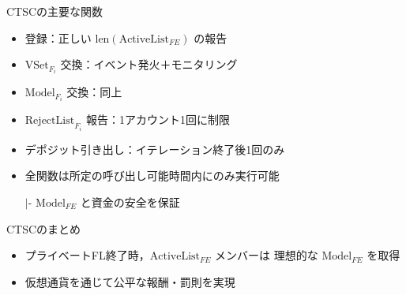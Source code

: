 \documentclass[unicode,12pt,aspectratio=169, dvipdfmx]{beamer}
\begin{document}
  \begin{frame}{CTSCの主要な関数}
    \begin{itemize}
      \item 登録：正しい \(\mathrm{len}(\mathrm{ActiveList}_{FE})\) の報告
      \item \(\mathrm{VSet}_{F_i}\) 交換：イベント発火＋モニタリング
      \item \(\mathrm{Model}_{F_i}\) 交換：同上
      \item \(\mathrm{RejectList}_{F_i}\) 報告：1アカウント1回に制限
      \item デポジット引き出し：イテレーション終了後1回のみ
      \item 全関数は所定の呼び出し可能時間内にのみ実行可能
      
      $|$- \(\mathrm{Model}_{FE}\) と資金の安全を保証
    \end{itemize}
  \end{frame}
  
  \begin{frame}{CTSCのまとめ}
    \begin{itemize}
      \item プライベートFL終了時，\(\mathrm{ActiveList}_{FE}\) メンバーは
        理想的な \(\mathrm{Model}_{FE}\) を取得
      \item 仮想通貨を通じて公平な報酬・罰則を実現
    \end{itemize}
  \end{frame}
\end{document}
